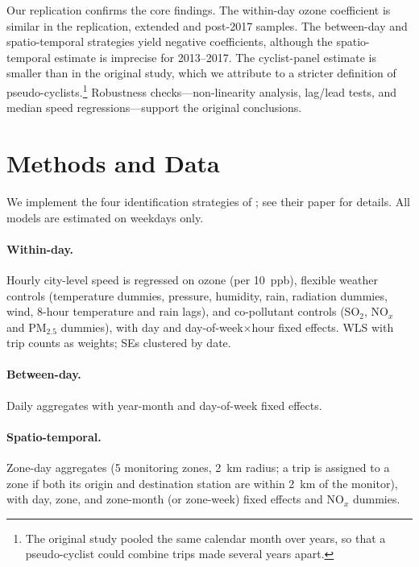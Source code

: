 \documentclass[12pt]{article}
\begin{document}
Our replication confirms the core findings. The within-day ozone coefficient is similar in the replication, extended and post-2017 samples. The between-day and spatio-temporal strategies yield negative coefficients, although the spatio-temporal estimate is imprecise for 2013--2017. The cyclist-panel estimate is smaller than in the original study, which we attribute to a stricter definition of pseudo-cyclists.\footnote{The original study pooled the same calendar month over years, so that a pseudo-cyclist could combine trips made several years apart.} Robustness checks---non-linearity analysis, lag/lead tests, and median speed regressions---support the original conclusions.


\section{Methods and Data} \label{sec:methods}

We implement the four identification strategies of \citet{klingen2020urban}; see their paper for details. All models are estimated on weekdays only.

\paragraph{Within-day.} Hourly city-level speed is regressed on ozone (per 10~ppb), flexible weather controls (temperature dummies, pressure, humidity, rain, radiation dummies, wind, 8-hour temperature and rain lags), and co-pollutant controls (SO$_2$, NO$_x$ and PM$_{2.5}$ dummies), with day and day-of-week$\times$hour fixed effects. WLS with trip counts as weights; SEs clustered by date.

\paragraph{Between-day.} Daily aggregates with year-month and day-of-week fixed effects.

\paragraph{Spatio-temporal.} Zone-day aggregates (5 monitoring zones, 2~km radius; a trip is assigned to a zone if both its origin and destination station are within 2~km of the monitor), with day, zone, and zone-month (or zone-week) fixed effects and NO$_x$ dummies.
\end{document}
